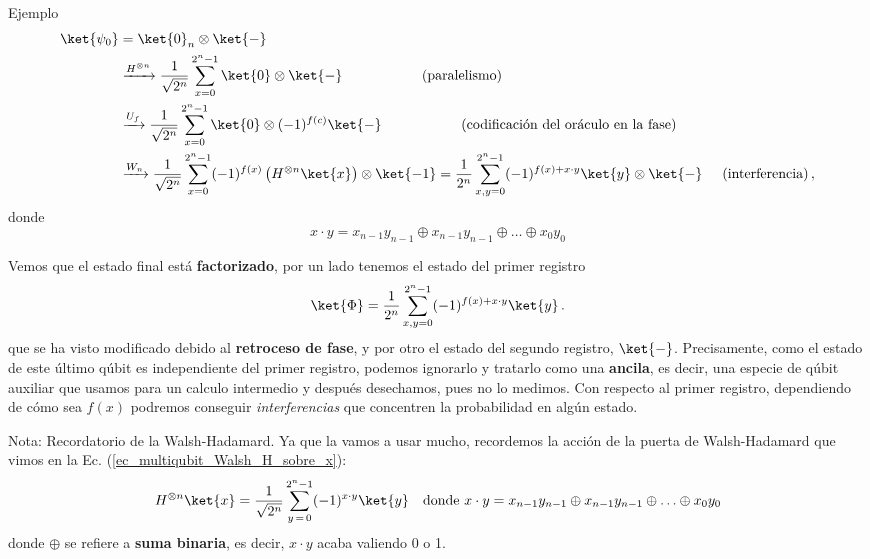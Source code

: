 \documentclass[a4paper,11pt]{book} %
\numberwithin{equation}{chapter}
\def\lp{\left(}
\def\rp{\right)}
\begin{document}
\begin{mybox_green}{Ejemplo}
    \begin{align*}
    \ket{\psi_0} & = \ket{0}_n \otimes \ket{-} \\
    & \xrightarrow{H^{\otimes n}}   \frac{1}{\sqrt{2^n}} \sum^{2^n -1}_{x=0} \ket{0} \otimes \ket{-} \hspace{2cm} \text{(paralelismo)} \\
    & \xrightarrow{U_f}             \frac{1}{\sqrt{2^n}} \sum^{2^n -1}_{x=0} \ket{0} \otimes (-1)^{f(c)} \ket{-} \hspace{2cm} \text{(codificación del oráculo en la fase)} \\
    & \xrightarrow{W_n}  			\frac{1}{\sqrt{2^n}} \sum^{2^n -1}_{x=0} (-1)^{f(x)} \lp H^{\otimes n} \ket{x} \rp \otimes \ket{-1} = 
      \frac{1}{2^n} \sum^{2^n -1}_{x,y=0} (-1)^{f(x)+x\cdot y}  \ket{y} \otimes \ket{-}  \hspace{0.5cm}  \text{(interferencia)} \, ,
    \end{align*}
	donde
	\begin{equation}
	x\cdot y = x_{n-1} y_{n-1} \oplus x_{n-1} y_{n-1} \oplus \ldots \oplus x_0 y_0
	\end{equation}
	
	Vemos que el estado final está \textbf{factorizado}, por un lado tenemos el estado del primer registro
		\begin{equation} \label{ec_algoritmos_Psi}
		\ket{\Phi} =  \frac{1}{2^n} \sum_{x,y=0}^{2^n-1}(-1)^{f(x)+ x \cdot y}\ket{y} \, .
		\end{equation}
	que se ha visto modificado debido al \textbf{retroceso de fase}, y por otro el estado del segundo registro, $\ket{-}$. Precisamente, como el estado de este último qúbit es independiente
	del primer registro, podemos ignorarlo y tratarlo como una \textbf{ancila}, es decir, una especie de qúbit auxiliar que 
	usamos para un calculo intermedio y después desechamos, pues no lo medimos. Con respecto al primer registro, dependiendo 
	de cómo sea $f(x)$ podremos conseguir \textit{interferencias} que  concentren la probabilidad en algún estado. 
	
	\end{mybox_green}

	\begin{mybox_blue}{Nota: Recordatorio de la Walsh-Hadamard.}
	Ya que la vamos a usar mucho, recordemos la acción de la puerta de Walsh-Hadamard que vimos en la Ec. (\ref{ec_multiqubit_Walsh_H_sobre_x}):	
	\begin{equation} \label{ec_algoritmos_Walsh_H_sobre_x}
	H^{\otimes n} \ket{x} = \frac{1}{\sqrt{2^n}} \sum_{y \, =\, 0}^{2^n-1}(-1)^{x\cdot y} \ket{y} ~~ \text{ donde } x\cdot y = x_{n-1} y_{n-1} \oplus x_{n-1} y_{n-1} \oplus \ldots \oplus x_0 y_0
	\end{equation} 	
	donde $\oplus$ se refiere a \textbf{suma binaria}, es decir, $x \cdot y$ acaba valiendo 0 o 1.
	\end{mybox_blue}
\end{document}
